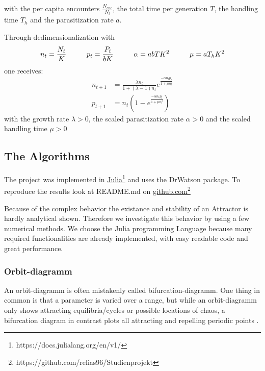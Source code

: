 \documentclass[a4paper,12pt, twoside]{article} %
\begin{document}
with the per capita encounters $\frac{N_{enc}}{N_t}$,  the total time per generation $T$, the handling time $T_h$ and the parasitization rate $a$. \autocite[see. chapter 2.4.1]{hassell}

Through dedimensionalization with
\begin{equation}
  n_t = \frac{N_t}{K} \hspace*{10mm} p_t=\frac{P_t}{bK} \hspace*{10mm} \alpha = abTK^2 \hspace*{10mm} \mu = aT_h K^2
\end{equation}
one receives:
\begin{equation}
  \begin{split}
    n_{t+1} &= \frac{\lambda n_t}{1+(\lambda -1) n_t} e^{\frac{-\alpha n_t p_t}{1+\mu n_t^2}}\\
    p_{t+1} &= n_t \left( 1-e^{\frac{-\alpha n_t p_t}{1+\mu n_t^2}}\right)
  \end{split}
\end{equation}
with the growth rate $\lambda > 0$, the scaled parasitization rate $\alpha > 0$ and 
the scaled handling time $\mu > 0$



\subsection{The Algorithms}
The project was implemented in \href{https://docs.julialang.org/en/v1/}{Julia}\footnote[1]{https://docs.julialang.org/en/v1/} and uses the DrWatson package.
To reproduce the results look at README.md on \href{https://github.com/relias96/Studienprojekt}{github.com}\footnote[2]{https://github.com/relias96/Studienprojekt}

Because of the complex behavior the existance and stability of an Attractor is hardly 
analytical shown. Therefore we investigate this behavior by using a few numerical methods. 
We choose the Julia programming Language because many required functionalities are already implemented, 
with easy readable code and great performance.\par

\subsubsection{Orbit-diagramm}
An orbit-diagramm is often mistakenly called bifurcation-diagramm. One thing in common is that a parameter is varied over a range, but while an orbit-diagramm only 
shows attracting equilibria/cycles or possible locations of chaos, a bifurcation diagram in contrast plots all attracting and repelling periodic points \autocite{bifurcation}.
\end{document}
